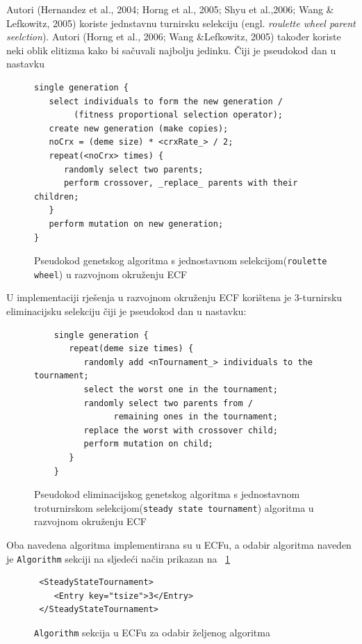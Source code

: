 \documentclass[times, utf8, zavrsni, numeric]{fer}
\begin{document}
Autori  (Hernandez et al., 2004; Horng et al., 2005; Shyu et al.,2006; Wang \& Lefkowitz, 2005) koriste jednstavnu turnirsku selekciju (engl. \textit{roulette wheel parent seelction}). Autori (Horng et al., 2006; Wang \&Lefkowitz, 2005) također koriste neki oblik elitizma kako bi sačuvali najbolju jedinku. Čiji je pseudokod dan u nastavku

\begin{figure}[h]

\begin{verbatim}
single generation {
   select individuals to form the new generation /
   		(fitness proportional selection operator);
   create new generation (make copies);
   noCrx = (deme size) * <crxRate_> / 2;
   repeat(<noCrx> times) {
      randomly select two parents;
      perform crossover, _replace_ parents with their children;
   }
   perform mutation on new generation;
}
\end{verbatim}
	\caption{Pseudokod genetskog algoritma s jednostavnom selekcijom(\texttt{roulette wheel}) u  razvojnom okruženju ECF}
\end{figure}

 U implementaciji rješenja u razvojnom okruženju ECF korištena je 3-turnirsku eliminacijsku selekciju čiji je pseudokod dan u nastavku:
 
 \begin{figure}[h]

 \begin{verbatim}
 	single generation {
 	   repeat(deme size times) {
 	      randomly add <nTournament_> individuals to the tournament;
  	      select the worst one in the tournament;
 	      randomly select two parents from /
 	      		remaining ones in the tournament;
 	      replace the worst with crossover child;
 	      perform mutation on child;
 	   }
 	}
 \end{verbatim}
  	\caption{Pseudokod eliminacijskog genetskog
  		algoritma s jednostavnom troturnirskom selekcijom(\texttt{steady state tournament}) algoritma u razvojnom okruženju ECF}
\end{figure}
 
 Oba navedena algoritma implementirana su u ECFu, a odabir algoritma naveden je \texttt{Algorithm} sekciji na sljedeći način prikazan na ~\ref{algSekcija}
 \begin{figure}
 	
 \begin{verbatim}
 <SteadyStateTournament>
 	<Entry key="tsize">3</Entry>               
 </SteadyStateTournament>
 \end{verbatim}
\caption{\texttt{Algorithm} sekcija u ECFu za odabir željenog algoritma}
\label{algSekcija}
\end{figure}
 
\end{document}
